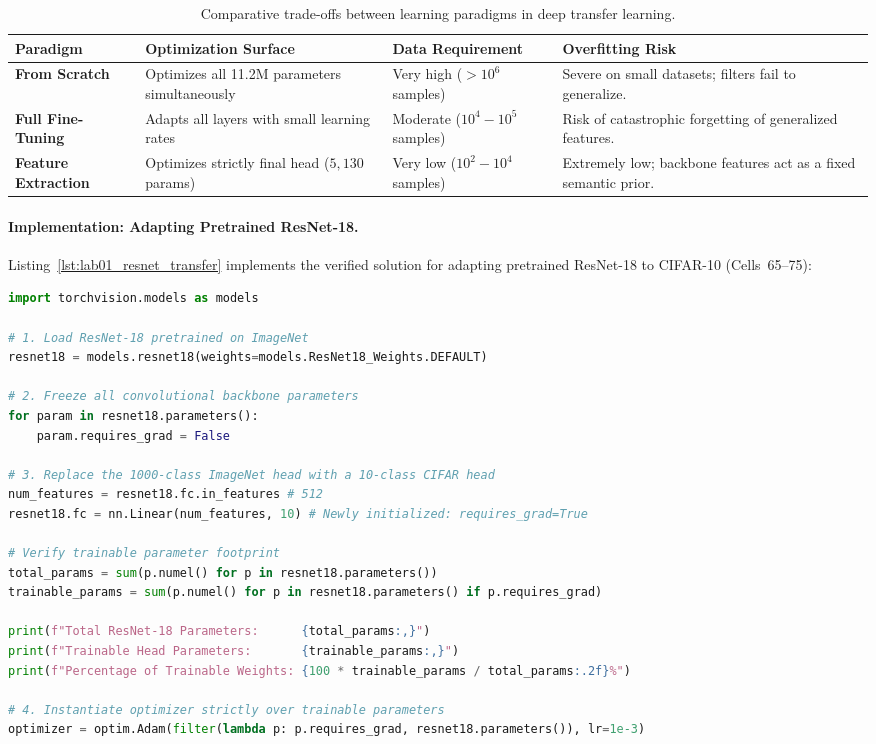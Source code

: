 \documentclass[11pt,a4paper]{article}
\begin{document}
\begin{table}[htbp]
\centering
\small
\renewcommand{\arraystretch}{1.2}
\begin{tabularx}{\textwidth}{l X X X}
\toprule
\textbf{Paradigm} & \textbf{Optimization Surface} & \textbf{Data Requirement} & \textbf{Overfitting Risk} \\
\midrule
\textbf{From Scratch} & Optimizes all 11.2M parameters simultaneously & Very high ($>10^6$ samples) & Severe on small datasets; filters fail to generalize. \\
\textbf{Full Fine-Tuning} & Adapts all layers with small learning rates & Moderate ($10^4 - 10^5$ samples) & Risk of catastrophic forgetting of generalized features. \\
\textbf{Feature Extraction} & Optimizes strictly final head ($5{,}130$ params) & Very low ($10^2 - 10^4$ samples) & Extremely low; backbone features act as a fixed semantic prior. \\
\bottomrule
\end{tabularx}
\caption{Comparative trade-offs between learning paradigms in deep transfer learning.}
\label{tab:transfer_tradeoffs}
\end{table}

\paragraph{Implementation: Adapting Pretrained ResNet-18.}

Listing~\ref{lst:lab01_resnet_transfer} implements the verified solution for adapting pretrained ResNet-18 to CIFAR-10 (Cells~65--75):

\begin{lstlisting}[language=Python, caption={Loading pretrained ResNet-18, freezing backbone, and adapting classifier head (Cells 65--75).}, label={lst:lab01_resnet_transfer}]
import torchvision.models as models

# 1. Load ResNet-18 pretrained on ImageNet
resnet18 = models.resnet18(weights=models.ResNet18_Weights.DEFAULT)

# 2. Freeze all convolutional backbone parameters
for param in resnet18.parameters():
    param.requires_grad = False

# 3. Replace the 1000-class ImageNet head with a 10-class CIFAR head
num_features = resnet18.fc.in_features # 512
resnet18.fc = nn.Linear(num_features, 10) # Newly initialized: requires_grad=True

# Verify trainable parameter footprint
total_params = sum(p.numel() for p in resnet18.parameters())
trainable_params = sum(p.numel() for p in resnet18.parameters() if p.requires_grad)

print(f"Total ResNet-18 Parameters:      {total_params:,}")
print(f"Trainable Head Parameters:       {trainable_params:,}")
print(f"Percentage of Trainable Weights: {100 * trainable_params / total_params:.2f}%")

# 4. Instantiate optimizer strictly over trainable parameters
optimizer = optim.Adam(filter(lambda p: p.requires_grad, resnet18.parameters()), lr=1e-3)
\end{lstlisting}
\end{document}

